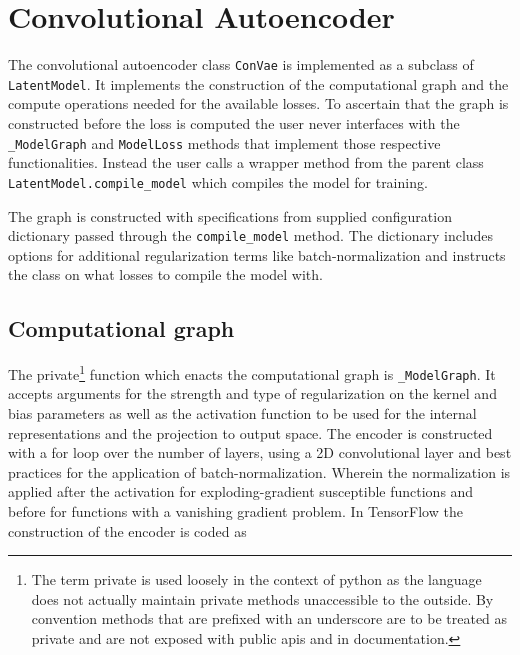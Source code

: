 
\section{Convolutional Autoencoder}\label{sec:convae_implement}

The convolutional autoencoder class \lstinline{ConVae} is implemented as a subclass of \lstinline{LatentModel}. It implements the construction of the computational graph and the compute operations needed for the available losses. To ascertain that the graph is constructed before the loss is computed the user never interfaces with the \lstinline{_ModelGraph} and \lstinline{ModelLoss} methods that implement those respective functionalities. Instead the user calls a wrapper method from the parent class \lstinline{LatentModel.compile_model} which compiles the model for training.

The graph is constructed with specifications from supplied configuration dictionary passed through the \lstinline{compile_model} method. The dictionary includes options for additional regularization terms like batch-normalization and instructs the class on what losses to compile the model with. 

\subsection{Computational graph}

The private\footnote{The term private is used loosely in the context of python as the language does not actually maintain private methods unaccessible to the outside. By convention methods that are prefixed with an underscore are to be treated as private and are not exposed with public apis and in documentation.} function which enacts the computational graph is \lstinline{_ModelGraph}. It accepts arguments for the strength and type of regularization on the kernel and bias parameters as well as the activation function to be used for the internal representations and the projection to output space. The encoder is constructed with a for loop over the number of layers, using a 2D convolutional layer and best practices for the application of batch-normalization. Wherein the normalization is applied after the activation for exploding-gradient susceptible functions and before for functions with a vanishing gradient problem. In TensorFlow the construction of the encoder is coded as 

